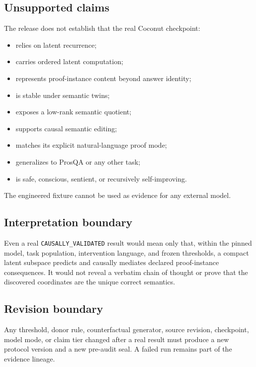 \documentclass[
  10pt,
]{article}
\providecommand{\tightlist}{%
  \setlength{\itemsep}{0pt}\setlength{\parskip}{0pt}}
\begin{document}
\subsection{Unsupported claims}\label{unsupported-claims}

The release does not establish that the real Coconut checkpoint:

\begin{itemize}
\tightlist
\item
  relies on latent recurrence;
\item
  carries ordered latent computation;
\item
  represents proof-instance content beyond answer identity;
\item
  is stable under semantic twins;
\item
  exposes a low-rank semantic quotient;
\item
  supports causal semantic editing;
\item
  matches its explicit natural-language proof mode;
\item
  generalizes to ProsQA or any other task;
\item
  is safe, conscious, sentient, or recursively self-improving.
\end{itemize}

The engineered fixture cannot be used as evidence for any external
model.

\subsection{Interpretation boundary}\label{interpretation-boundary}

Even a real \texttt{CAUSALLY\_VALIDATED} result would mean only that,
within the pinned model, task population, intervention language, and
frozen thresholds, a compact latent subspace predicts and causally
mediates declared proof-instance consequences. It would not reveal a
verbatim chain of thought or prove that the discovered coordinates are
the unique correct semantics.

\subsection{Revision boundary}\label{revision-boundary}

Any threshold, donor rule, counterfactual generator, source revision,
checkpoint, model mode, or claim tier changed after a real result must
produce a new protocol version and a new pre-audit seal. A failed run
remains part of the evidence lineage.
\end{document}
